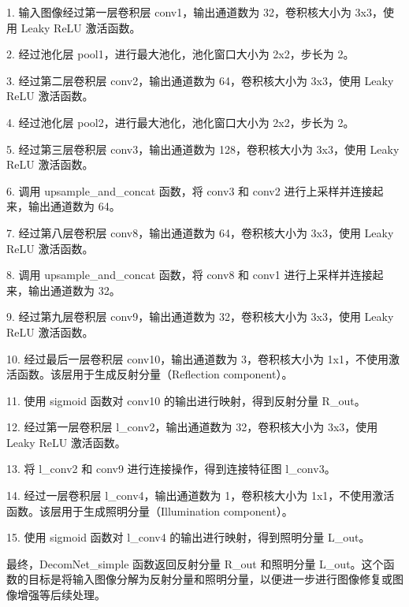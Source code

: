 \documentclass[letterpaper,12pt]{article}
\begin{document}
		1. 输入图像经过第一层卷积层 conv1，输出通道数为 32，卷积核大小为 3x3，使用 Leaky ReLU 激活函数。
		
		2. 经过池化层 pool1，进行最大池化，池化窗口大小为 2x2，步长为 2。
		
		3. 经过第二层卷积层 conv2，输出通道数为 64，卷积核大小为 3x3，使用 Leaky ReLU 激活函数。
		
		4. 经过池化层 pool2，进行最大池化，池化窗口大小为 2x2，步长为 2。
		
		5. 经过第三层卷积层 conv3，输出通道数为 128，卷积核大小为 3x3，使用 Leaky ReLU 激活函数。
		
		6. 调用 upsample\_and\_concat 函数，将 conv3 和 conv2 进行上采样并连接起来，输出通道数为 64。
		
		7. 经过第八层卷积层 conv8，输出通道数为 64，卷积核大小为 3x3，使用 Leaky ReLU 激活函数。
		
		8. 调用 upsample\_and\_concat 函数，将 conv8 和 conv1 进行上采样并连接起来，输出通道数为 32。
		
		9. 经过第九层卷积层 conv9，输出通道数为 32，卷积核大小为 3x3，使用 Leaky ReLU 激活函数。
		
		10. 经过最后一层卷积层 conv10，输出通道数为 3，卷积核大小为 1x1，不使用激活函数。该层用于生成反射分量（Reflection component）。
		
		11. 使用 sigmoid 函数对 conv10 的输出进行映射，得到反射分量 R\_out。
		
		12. 经过第一层卷积层 l\_conv2，输出通道数为 32，卷积核大小为 3x3，使用 Leaky ReLU 激活函数。
		
		13. 将 l\_conv2 和 conv9 进行连接操作，得到连接特征图 l\_conv3。
		
		14. 经过一层卷积层 l\_conv4，输出通道数为 1，卷积核大小为 1x1，不使用激活函数。该层用于生成照明分量（Illumination component）。
		
		15. 使用 sigmoid 函数对 l\_conv4 的输出进行映射，得到照明分量 L\_out。
		
		最终，DecomNet\_simple 函数返回反射分量 R\_out 和照明分量 L\_out。这个函数的目标是将输入图像分解为反射分量和照明分量，以便进一步进行图像修复或图像增强等后续处理。
	
\end{document}
